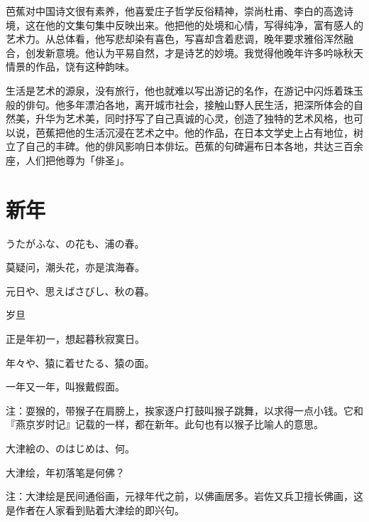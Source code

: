 {    芭蕉对中国诗文很有素养，他喜爱庄子哲学反俗精神，崇尚杜甫、李白的高逸诗境，这在他的文集句集中反映出来。他把他的处境和心情，写得纯净，富有感人的艺术力。从总体看，他写悲却染有喜色，写喜却含着悲调，晚年要求雅俗浑然融合，创发新意境。他认为平易自然，才是诗艺的妙境。我觉得他晚年许多吟咏秋天情景的作品，饶有这种韵味。

    生活是艺术的源泉，没有旅行，他也就难以写出游记的名作，在游记中闪烁着珠玉般的俳句。他多年漂泊各地，离开城市社会，接触山野人民生活，把深所体会的自然美，升华为艺术美，同时抒写了自己真诚的心灵，创造了独特的艺术风格，也可以说，芭蕉把他的生活沉浸在艺术之中。他的作品，在日本文学史上占有地位，树立了自己的丰碑。他的俳风影响日本俳坛。芭蕉的句碑遍布日本各地，共达三百余座，人们把他尊为「俳圣」。


}

\newpage

\section{\FK 新年}

\setcounter{haikucounter}{0}

\begin{haiku}
    {\FH うたがふな、の花も、浦の春。}

    {\FK 莫疑问，潮头花，亦是滨海春。}
\end{haiku}

\begin{haiku}
    {\FH 元日や、思えばさびし、秋の暮。}

    {\FK 岁旦}

    {\FK 正是年初一，想起暮秋寂寞日。}
\end{haiku}

\begin{haiku}
    {\FH 年々や、猿に着せたる、猿の面。}

    {\FK 一年又一年，叫猴戴假面。}

    {\FT 注：耍猴的，带猴子在肩膀上，挨家逐户打鼓叫猴子跳舞，以求得一点小钱。它和『燕京岁时记』记载的一样，都在新年。此句也有以猴子比喻人的意思。}
\end{haiku}

\begin{haiku}
    {\FH 大津絵の、のはじめは、何。}

    {\FK 大津绘，年初落笔是何佛？}

    {\FT 注：大津绘是民间通俗画，元禄年代之前，以佛画居多。岩佐又兵卫擅长佛画，这是作者在人家看到贴着大津绘的即兴句。}
\end{haiku}

